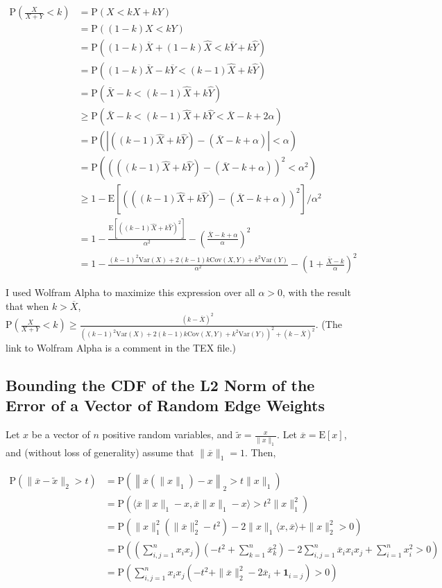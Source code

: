 \documentclass{article}
\newcommand \E[1] {\mathrm E \left[#1\right]} %
\newcommand \Var[1] {\mathrm {Var} \left(#1\right)} %
\newcommand \Cov[2] {\mathrm {Cov} (#1, #2)} %
\newcommand \p[1] {\mathrm P \left(#1\right)}
\begin{document}
\begin{align*}
\p{\frac X{X+Y}<k} &= \p{X<kX+kY}\\
&= \p{(1-k)X<kY}\\
&= \p{(1-k)\overline X + (1-k)\hat X < k\overline Y + k\hat Y}\\
&= \p{(1-k)\overline X - k\overline Y < (k-1)\hat X + k\hat Y}\\
&= \p{\bar X-k<(k-1)\hat X + k\hat Y}\\
&\geq \p{\bar X-k<(k-1)\hat X + k\hat Y<\overline X-k+2\alpha}\\
&= \p{\left|\left((k-1)\hat X + k\hat Y\right)-\left(\overline X-k+\alpha\right)\right|<\alpha}\\
&= \p{\left(\left((k-1)\hat X + k\hat Y\right)-\left(\overline X-k+\alpha\right)\right)^2<\alpha^2}\\
&\geq 1-\E{\left(\left((k-1)\hat X + k\hat Y\right)-\left(\overline X-k+\alpha\right)\right)^2}/\alpha^2\\
&= 1-\frac{\E{\left((k-1)\hat X + k\hat Y\right)^2}}{\alpha^2}-\left(\frac{\overline X-k+\alpha}\alpha\right)^2\\
&= 1-\frac{(k-1)^2\Var X + 2(k-1)k\Cov X Y + k^2\Var Y}{\alpha^2}-\left(1+\frac{\overline X-k}\alpha\right)^2
\end{align*}

I used Wolfram Alpha to maximize this expression over all $\alpha>0$, with the result that when $k>\overline X$, $\p{\frac X{X+Y}<k}\geq \frac{(k-\overline X)^2}{((k-1)^2\Var X + 2(k-1)k\Cov X Y + k^2\Var Y)^2+(k-\overline X)^2}$. (The link to Wolfram Alpha is a comment in the TEX file.)

\subsection{Bounding the CDF of the L2 Norm of the Error of a Vector of Random Edge Weights}

Let $x$ be a vector of $n$ positive random variables, and $\tilde x=\frac x{\|x\|_1}$. Let $\overline x=\E x$, and (without loss of generality) assume that $\|\overline x\|_1=1$. Then,

\begin{align*}
\p{\|\overline x-\tilde x\|_2>t} &= \p{\left\|\overline x (\|x\|_1) - x \right\|_2 > t\|x\|_1} \\
&= \p{\langle \overline x \|x\|_1 - x, \overline x \|x\|_1 - x\rangle>t^2\|x\|_1^2} \\
&= \p{\|x\|_1^2(\|\overline x\|_2^2-t^2) - 2\|x\|_1\langle x,\overline x\rangle + \|x\|_2^2 > 0} \\
&= \p{\left(\sum_{i,j=1}^n x_ix_j\right)\left(-t^2+\sum_{k=1}^n \overline x_k^2\right)-2\sum_{i,j=1}^n \overline x_i x_i x_j + \sum_{i=1}^n x_i^2 > 0} \\
&= \p{\sum_{i,j=1}^n x_ix_j \left( -t^2 + \|\overline x\|_2^2 -2\overline x_i + \mathbf 1_{i=j}\right) > 0}
\end{align*}
\end{document}
